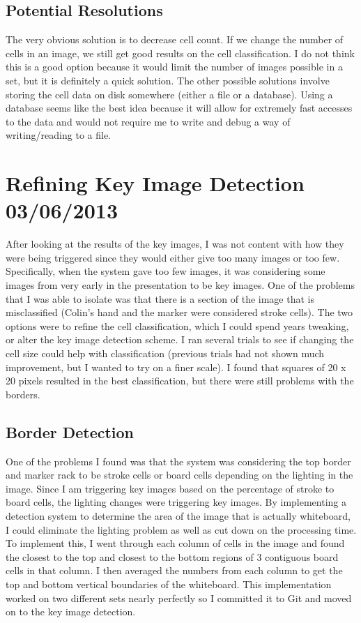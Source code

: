 \documentclass[]{article}
\begin{document}
		\subsection{Potential Resolutions}
			The very obvious solution is to decrease cell count. If we change the number of cells in an image, we still get good results on the cell classification. I do not think this is a good option because it would limit the number of images possible in a set, but it is definitely a quick solution. The other possible solutions involve storing the cell data on disk somewhere (either a file or a database). Using a database seems like the best idea because it will allow for extremely fast accesses to the data and would not require me to write and debug a way of writing/reading to a file. 
			
	\section{Refining Key Image Detection 03/06/2013}
		After looking at the results of the key images, I was not content with how they were being triggered since they would either give too many images or too few. Specifically, when the system gave too few images, it was considering some images from very early in the presentation to be key images. One of the problems that I was able to isolate was that there is a section of the image that is misclassified (Colin's hand and the marker were considered stroke cells). The two options were to refine the cell classification, which I could spend years tweaking, or alter the key image detection scheme. I ran several trials to see if changing the cell size could help with classification (previous trials had not shown much improvement, but I wanted to try on a finer scale). I found that squares of 20 x 20 pixels resulted in the best classification, but there were still problems with the borders. 
		
		\subsection{Border Detection}
			One of the problems I found was that the system was considering the top border and marker rack to be stroke cells or board cells depending on the lighting in the image. Since I am triggering key images based on the percentage of stroke to board cells, the lighting changes were triggering key images. By implementing a detection system to determine the area of the image that is actually whiteboard, I could eliminate the lighting problem as well as cut down on the processing time. To implement this, I went through each column of cells in the image and found the closest to the top and closest to the bottom regions of 3 contiguous board cells in that column. I then averaged the numbers from each column to get the top and bottom vertical boundaries of the whiteboard. This implementation worked on two different sets nearly perfectly so I committed it to Git and moved on to the key image detection.
			
\end{document}
